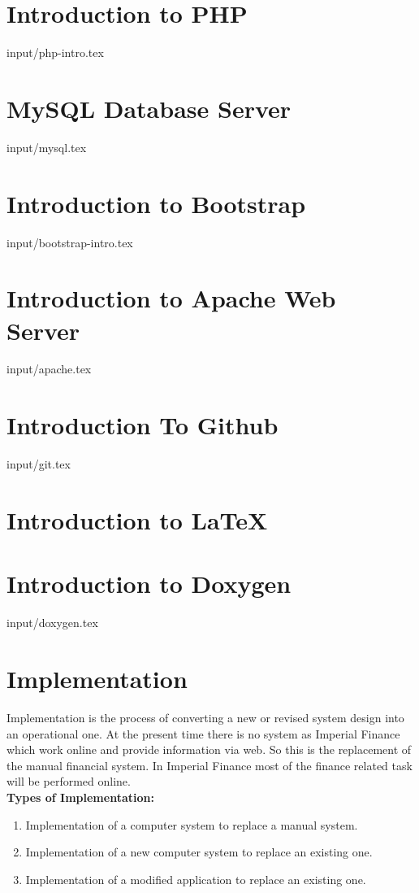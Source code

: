 \section{Introduction to PHP}
 {input/php-intro.tex}
\section{MySQL Database Server}
 {input/mysql.tex}
\section{Introduction to Bootstrap} 

 {input/bootstrap-intro.tex}
\section{Introduction to Apache Web Server}

 {input/apache.tex}
\section{Introduction To Github}
 {input/git.tex}


\section{Introduction to \LaTeX}


\section{Introduction to Doxygen}
 {input/doxygen.tex}
\newpage
\section{Implementation}
Implementation is the process of converting a new or revised system 
design into an operational one. At the present time there is no system 
as Imperial Finance which work online and provide information via web.
So this is the replacement of the manual financial system. In Imperial 
Finance most of the finance related task will be performed online.\\

{\bf Types of Implementation:}
\begin{enumerate}
\item Implementation of a computer system to replace a manual system.
\item Implementation of a new computer system to replace an existing one.
\item Implementation of a modified application to replace an existing one.\\
\end{enumerate} 

